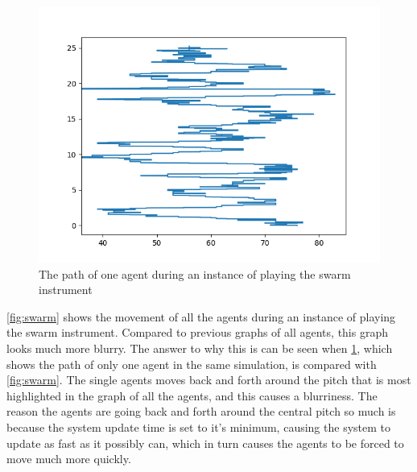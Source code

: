 \documentclass[a4paper,english]{report}
\begin{document}
	\begin{figure}
		\centering
		\includegraphics[width=1\linewidth]{swarminstrumentOneAgent}
		\caption{The path of one agent during an instance of playing the swarm instrument}
		\label{fig:swarmOne}
	\end{figure}
	\ref{fig:swarm} shows the movement of all the agents during an instance of playing the swarm instrument. Compared to previous graphs of all agents, this graph looks much more blurry. The answer to why this is can be seen when \ref{fig:swarmOne}, which shows the path of only one agent in the same simulation, is compared with \ref{fig:swarm}. The single agents moves back and forth around the pitch that is most highlighted in the graph of all the agents, and this causes a blurriness. The reason the agents are going back and forth around the central pitch so much is because the system update time is set to it's minimum, causing the system to update as fast as it possibly can, which in turn causes the agents to be forced to move much more quickly.
	
	
\end{document}
